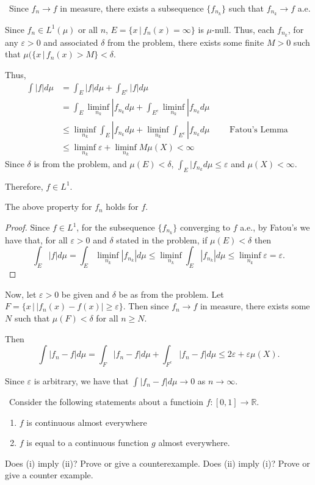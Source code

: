 \documentclass[12pt]{Qual}
\begin{document}
\begin{solution}$\,$
Since $f_n\to f$ in measure, there exists a subsequence $\{f_{n_k}\}$ such that $f_{n_k}\to f$ a.e.

Since $f_n\in L^1(\mu)$ or all $n$, $E=\{x\,|\,f_n(x)=\infty\}$ is $\mu$-null. Thus, each $f_{n_k}$, for any $\varepsilon>0$ and associated $\delta$ from the problem, there exists some finite $M>0$ such that $\mu(\{x\,|\,f_n(x)>M\}<\delta$.

Thus, \begin{align*}
    \int|f|d\mu&=\int_E|f|d\mu+\int_{E^c}|f|d\mu\\
    &=\int_E\liminf_{n_k}|f_{n_k}d\mu+\int_{E^c}\liminf_{n_k}|f_{n_k}d\mu\\
    &\le \liminf_{n_k}\int_E|f_{n_k}d\mu+\liminf_{n_k}\int_{E^c}|f_{n_k}d\mu\qquad\text{ Fatou's Lemma }\\
    &\le \liminf_{n_k}\varepsilon+\liminf_{n_k}M\mu(X)<\infty \tag{1}
\end{align*}
 Since $\delta$ is from the problem, and $\mu(E)<\delta$, $\int_E|f_{n_k}d\mu\le \varepsilon$ and $\mu(X)<\infty$.

Therefore, $f\in L^1$.

\begin{claim} The above property for $f_n$ holds for $f$.
\begin{proof} Since $f\in L^1$, for the subsequence $\{f_{n_k}\}$ converging to $f$ a.e., by Fatou's we have that, for all $\varepsilon>0$ and $\delta$ stated in the problem, if $\mu(E)<\delta$ then
$$\int_E|f|d\mu=\int_E\liminf_{n_k}|f_{n_k}|d\mu\le \liminf_{n_k}\int_E|f_{n_k}|d\mu\le\liminf_{n_k}\varepsilon=\varepsilon.$$
\end{proof}
\end{claim}

Now, let $\varepsilon>0$ be given and $\delta$ be as from the problem. Let $F=\{x\,|\,|f_n(x)-f(x)|\ge\varepsilon\}$. Then since $f_n\to f$ in measure, there exists some $N$ such that $\mu(F)<\delta$ for all $n\ge N$.

Then $$\int|f_n-f|d\mu=\int_F|f_n-f|d\mu+\int_{F^c}|f_n-f|d\mu\le 2\varepsilon+\varepsilon\mu(X).$$

Since $\varepsilon$ is arbitrary, we have that $\int|f_n-f|d\mu\to 0$ as $n\to\infty.$
\end{solution}
\newpage

\begin{problem}[Folland, 2.3.25, p.59] $\,$
Consider the following statements about a functioin $f:[0,1]\to\mathbb{R}$.
\begin{enumerate}[label=(\roman*)]
    \item $f$ is continuous almost everywhere
    \item $f$ is equal to a continuous function $g$ almost everywhere.
\end{enumerate}

Does (i) imply (ii)? Prove or give a counterexample. Does (ii) imply (i)? Prove or give a counter example.
\end{problem}
\end{document}
